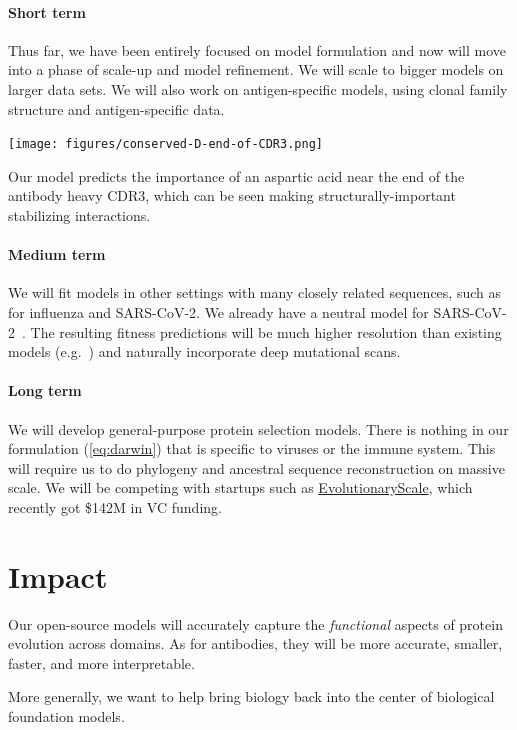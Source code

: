 \documentclass[nobib]{tufte-handout}
\begin{document}
\paragraph{Short term}
Thus far, we have been entirely focused on model formulation and now will move into a phase of scale-up and model refinement. We will scale to bigger models on larger data sets. We will also work on antigen-specific models, using clonal family structure and antigen-specific data.

\begin{marginfigure}[1.3cm]%
  \hspace{-7pt}
  \texttt{[image: figures/conserved-D-end-of-CDR3.png]}
  \caption{Our model predicts the importance of an aspartic acid near the end of the antibody heavy CDR3, which can be seen making structurally-important stabilizing interactions.}
  \label{fig:interpretation}
\end{marginfigure}

\paragraph{Medium term}
We will fit models in other settings with many closely related sequences, such as for influenza and SARS-CoV-2.
We already have a neutral model for SARS-CoV-2~\cite{Haddox2025-ej}.
The resulting fitness predictions will be much higher resolution than existing models (e.g.~\cite{Bloom2023-af}) and naturally incorporate deep mutational scans.

\paragraph{Long term}
We will develop general-purpose protein selection models.
There is nothing in our formulation (\ref{eq:darwin}) that is specific to viruses or the immune system.
This will require us to do phylogeny and ancestral sequence reconstruction on massive scale.
We will be competing with startups such as \href{https://www.evolutionaryscale.ai/}{EvolutionaryScale}, which recently got \$142M in VC funding.

\section{Impact}
Our open-source models will accurately capture the \emph{functional} aspects of protein evolution across domains. 
As for antibodies, they will be more accurate, smaller, faster, and more interpretable.

More generally, we want to help bring biology back into the center of biological foundation models.




\newpage


\end{document}
